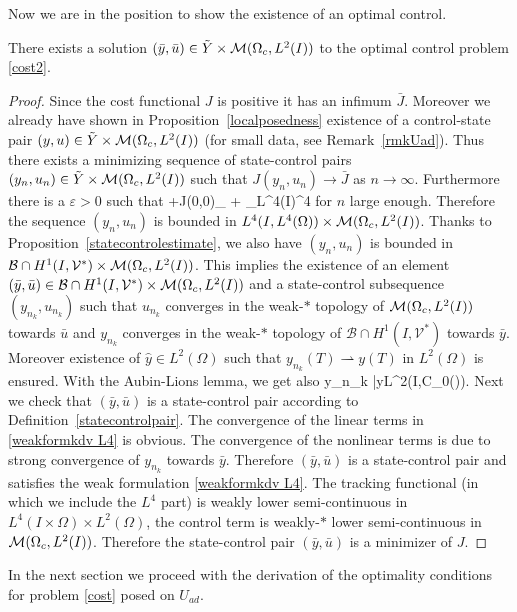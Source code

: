 Now we are in the position to show the existence of an optimal control.
\begin{proposition}
There exists a solution $(\bar y, \bar u)\in \tilde Y\times \mathcal{M}(\Omega_c, L^{2}(I)) $ to the optimal control problem \eqref{cost2}.
\end{proposition}
\begin{proof}
Since the cost functional $J$ is positive it has an infimum $\bar J$. Moreover we already have shown in Proposition~\ref{localposedness} existence of a control-state pair $(y,u)\in \tilde Y\times \mathcal{M}(\Omega_c, L^{2}(I))$ (for small data, see Remark~\ref{rmkUad}). Thus there exists a minimizing sequence of state-control pairs $(y_n,u_n) \in \tilde Y\times \mathcal{M}(\Omega_c, L^{2}(I))$ such that $J(y_n, u_n) \rightarrow \bar J$ as $n \rightarrow \infty$. Furthermore there is a $\varepsilon>0$ such that
\be
\varepsilon+J(0,0)\geq \alpha {}_{\M} +  _{L^4(I\times \Omega)}^4
\ee
for $n$ large enough. Therefore the sequence $(y_n,u_n)$ is bounded in $L^4(I,L^4(\Omega))\times \mathcal{M}(\Omega_c, L^{2}(I))$. Thanks to Proposition~\ref{statecontrolestimate}, we also have $(y_n,u_n)$ is bounded in $\mathcal{B}\cap H^{1}(I, \mathcal{V}^{*})\times \mathcal{M}(\Omega_c, L^{2}(I))$. This implies the existence of an element $(\bar y, \bar u)\in \mathcal{B}\cap H^{1}(I, \mathcal{V}^{*})\times \mathcal{M}(\Omega_c, L^{2}(I))$ and a state-control subsequence $(y_{n_k},u_{n_k})$  such that $u_{n_k}$ converges in the weak-$*$ topology of $\mathcal{M}(\Omega_c, L^{2}(I))$ towards $\bar u$ and $y_{n_k}$ converges in the weak-$\ast$ topology of $\mathcal{B}\cap H^{1}(I, \mathcal{V}^{*})$ towards $\bar y$. Moreover existence of $\hat y \in L^2(\Omega)$ such that $y_{n_k}(T) \rightharpoonup y(T)$ in $L^2(\Omega)$ is ensured. With the Aubin-Lions lemma, we get also
\be
\nonumber
y_{n_k} \rightarrow \bar y\quad{}\quad L^2(I,\mathcal C_0(\Omega)).
\ee
Next we check that $(\bar y, \bar u)$ is a state-control pair according to Definition~\ref{statecontrolpair}. The convergence of the linear terms in \eqref{weakformkdv L4} is obvious. The convergence of the nonlinear terms is due to strong convergence of $y_{n_k}$ towards $\bar y$. %
Therefore $(\bar y, \bar u)$ is a state-control pair and satisfies the weak formulation \eqref{weakformkdv L4}. The tracking functional (in which we include the $L^4$ part) is weakly lower semi-continuous in $L^4(I\times \Omega)\times L^2(\Omega)$, the control term is weakly-$*$ lower semi-continuous in $\mathcal{M}(\Omega_c, L^{2}(I))$. Therefore the state-control pair $(\bar y, \bar u)$ is a minimizer of $J$.
\qquad\end{proof}

In the next section we proceed with the derivation of the optimality conditions for problem \eqref{cost} posed on $U_{ad}$.


